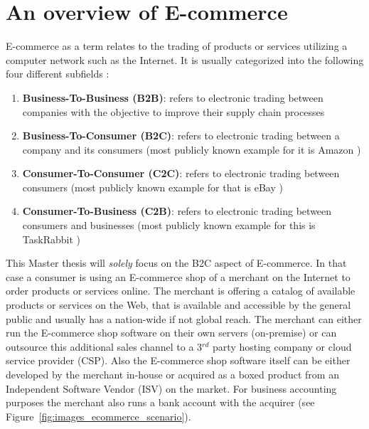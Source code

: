 
\section{An overview of \gls{E-commerce}}
\label{sec:e_commerce_scenario}

\gls{E-commerce} as a term relates to the trading of products or services utilizing a computer network such as the Internet. It is usually categorized into the following four different subfields \citep{sen2015study}:\@

\begin{enumerate}
  \item \textbf{Business-To-Business (\gls{B2B})}: refers to electronic trading between companies with the objective to improve their supply chain processes
  \item \textbf{Business-To-Consumer (\gls{B2C})}: refers to electronic trading between a company and its consumers (most publicly known example for it is Amazon \citep{Amazon.com})
  \item \textbf{Consumer-To-Consumer (\gls{C2C})}: refers to electronic trading between consumers (most publicly known example for that is eBay \citep{eBayInc})
  \item \textbf{Consumer-To-Business (\gls{C2B})}: refers to electronic trading between consumers and businesses (most publicly known example for this is TaskRabbit \citep{TaskRabbit})
\end{enumerate}

This Master thesis will \emph{solely} focus on the \gls{B2C} aspect of \gls{E-commerce}. In that case a consumer is using an \gls{E-commerce} shop of a merchant on the Internet to order products or services online. The merchant is offering a catalog of available products or services on the Web, that is available and accessible by the general public and usually has a nation-wide if not global reach. The merchant can either run the \gls{E-commerce} shop software on their own servers (on-premise) or can outsource this additional sales channel to a 3$^{rd}$ party hosting company or cloud service provider (\gls{CSP}). Also the \gls{E-commerce} shop software itself can be either developed by the merchant in-house or acquired as a boxed product from an Independent Software Vendor (\gls{ISV}) on the market. For business accounting purposes the merchant also runs a bank account with the acquirer (see Figure~\ref{fig:images_ecommerce_scenario}). \\

